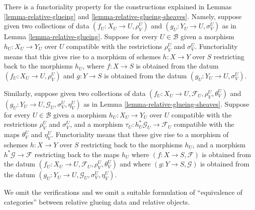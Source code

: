 \begin{remark}
\label{remark-relative-glueing-functorial}
There is a functoriality property for the constructions explained
in Lemmas \ref{lemma-relative-glueing} and
\ref{lemma-relative-glueing-sheaves}. Namely, suppose given
two collections of data $(f_U : X_U \to U, \rho^U_V)$ and
$(g_U : Y_U \to U, \sigma^U_V)$ as in Lemma \ref{lemma-relative-glueing}.
Suppose for every $U \in \mathcal{B}$ given
a morphism $h_U : X_U \to Y_U$ over $U$ compatible with
the restrictions $\rho^U_V$ and $\sigma^U_V$. Functoriality
means that this gives rise to a morphism of schemes
$h : X \to Y$ over $S$ restricting back to the morphisms $h_U$,
where $f : X \to S$ is obtained from
the datum $(f_U : X_U \to U, \rho^U_V)$ and $g : Y \to S$
is obtained from the datum $(g_U : Y_U \to U, \sigma^U_V)$.

\medskip\noindent
Similarly, suppose given
two collections of data
$(f_U : X_U \to U, \mathcal{F}_U, \rho^U_V, \theta^U_V)$ and
$(g_U : Y_U \to U, \mathcal{G}_U, \sigma^U_V, \eta^U_V)$
as in Lemma \ref{lemma-relative-glueing-sheaves}.
Suppose for every $U \in \mathcal{B}$ given
a morphism $h_U : X_U \to Y_U$ over $U$ compatible with
the restrictions $\rho^U_V$ and $\sigma^U_V$, and a morphism
$\tau_U : h_U^*\mathcal{G}_U \to \mathcal{F}_U$ compatible with
the maps $\theta^U_V$ and $\eta^U_V$. Functoriality
means that these give rise to a morphism of schemes
$h : X \to Y$ over $S$ restricting back to the morphisms $h_U$,
and a morphism $h^*\mathcal{G} \to \mathcal{F}$ restricting back
to the maps $h_U$
where $(f : X \to S, \mathcal{F})$ is obtained from the datum
$(f_U : X_U \to U, \mathcal{F}_U, \rho^U_V, \theta^U_V)$ and
where $(g : Y \to S, \mathcal{G})$ is obtained from the datum
$(g_U : Y_U \to U, \mathcal{G}_U, \sigma^U_V, \eta^U_V)$.

\medskip\noindent
We omit the verifications and we omit a suitable formulation of
``equivalence of categories'' between relative glueing data
and relative objects.
\end{remark}















